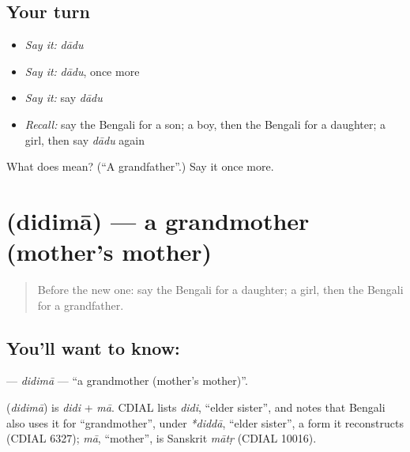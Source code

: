 \subsection*{Your turn}
\begin{itemize}
\raggedright
  \item \emph{Say it:} \emph{dādu}
  \item \emph{Say it:} \emph{dādu}, once more
  \item \emph{Say it:} say \emph{dādu}
  \item \emph{Recall:} say the Bengali for a son; a boy, then the Bengali for a daughter; a girl, then say \emph{dādu} again
\end{itemize}

\begin{tcolorbox}[breakable,colback=teal!4,colframe=teal!35!black,title={Before you move on}]
What does  mean? (\textquotedblleft{}A grandfather\textquotedblright{}.) Say it once more.
\end{tcolorbox}
\section[\texorpdfstring{\bn{দিদিমা} (didimā)}{দিদিমা (didimā)}]{ (didimā) — a grandmother (mother's mother)}

\label{lesson:BN-C46-didima}



\begin{quote}
Before the new one: say the Bengali for a daughter; a girl, then the Bengali for a grandfather.
\end{quote}

\subsection*{You'll want to know: }
\textbf{} — \emph{didimā} — \textquotedblleft{}a grandmother (mother's mother)\textquotedblright{}.

\begin{cousinweb}
\textbf{} (\emph{didimā}) is \emph{didi} + \emph{mā}. CDIAL lists \emph{didi}, \textquotedblleft{}elder sister\textquotedblright{}, and notes that Bengali also uses it for \textquotedblleft{}grandmother\textquotedblright{}, under \emph{*diddā}, \textquotedblleft{}elder sister\textquotedblright{}, a form it reconstructs (CDIAL 6327); \emph{mā}, \textquotedblleft{}mother\textquotedblright{}, is Sanskrit \emph{mātṛ} (CDIAL 10016).
\end{cousinweb}

